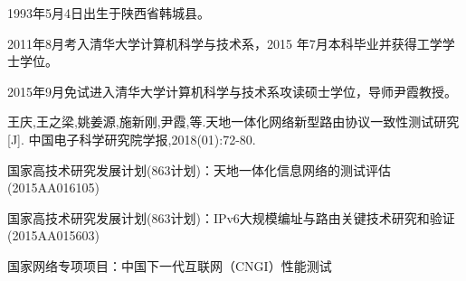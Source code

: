 \begin{resume}


  1993年5月4日出生于陕西省韩城县。

  2011年8月考入清华大学计算机科学与技术系，2015 年7月本科毕业并获得工学学士学位。

  2015年9月免试进入清华大学计算机科学与技术系攻读硕士学位，导师尹霞教授。


  \begin{publications}
    \item 王庆,王之梁,姚姜源,施新刚,尹霞,等.天地一体化网络新型路由协议一致性测试研究[J]. 中国电子科学研究院学报,2018(01):72-80.
  \end{publications}

%

  \begin{achievements}
    \item 国家高技术研究发展计划(863计划)：天地一体化信息网络的测试评估(2015AA016105)
    \item 国家高技术研究发展计划(863计划)：IPv6大规模编址与路由关键技术研究和验证(2015AA015603)
    \item 国家网络专项项目：中国下一代互联网（CNGI）性能测试
  \end{achievements}

\end{resume}

